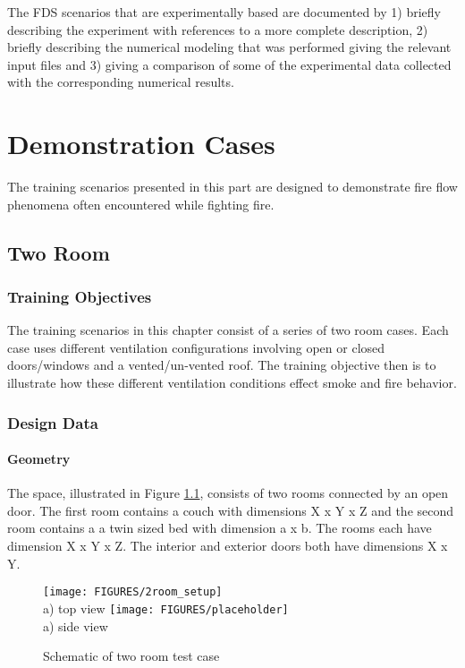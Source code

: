 \documentclass[11pt]{book}
\begin{document}
The FDS scenarios that are experimentally based are documented by 1) briefly describing the experiment with references to a more complete description, 2) briefly describing the numerical modeling that was performed giving the relevant input files and 3) giving a comparison of some of the experimental data collected with the corresponding numerical results.


\part{Demonstration Cases}
The training scenarios presented in this part are designed to demonstrate fire flow phenomena often encountered while fighting fire.



\chapter{Two Room}
\section{Training Objectives}
The training scenarios in this chapter consist of a series of two room cases.  Each case uses different ventilation configurations
involving open or closed doors/windows and a vented/un-vented roof.  The training
objective then is to illustrate how these different ventilation conditions effect smoke and fire behavior.

\section{Design Data}
\subsection{Geometry}
The space, illustrated in Figure \ref{fig2roomplan}, consists of two rooms connected by an open door.  The first room contains a couch
with dimensions X x Y x Z and the second
room contains a a twin sized bed with dimension a x b.  The rooms
each have dimension X x Y x Z.  The interior and exterior doors both have 
dimensions X x Y.  

\begin{figure}[\figoptions]
\begin{center}
\texttt{[image: FIGURES/2room\_setup]}\\
a) top view
\texttt{[image: FIGURES/placeholder]}\\
a) side view
\end{center}
\caption {Schematic of two room test case}
\label{fig2roomplan}%
\end{figure}
\end{document}
